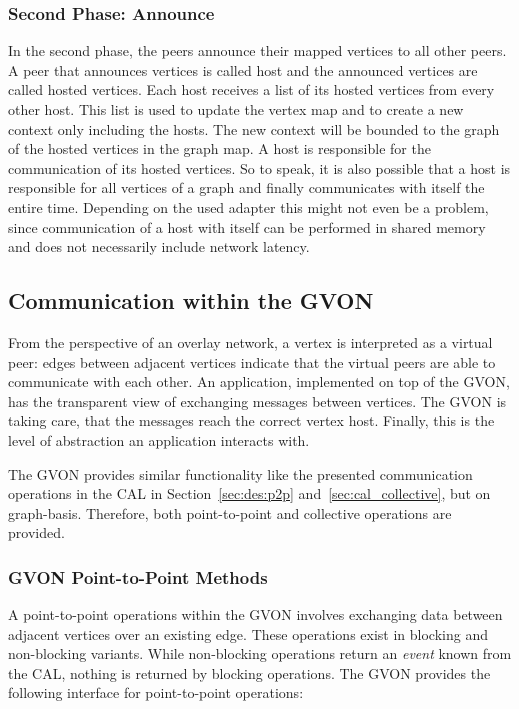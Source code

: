 \subsubsection*{Second Phase: Announce}
In the second phase, the peers announce their mapped vertices to all
other peers.  A peer that announces vertices is called host and the
announced vertices are called hosted vertices.  Each host receives a
list of its hosted vertices from every other host.  This list is used
to update the vertex map and to create a new context only including
the hosts. The new context will be bounded to the graph of the hosted
vertices in the graph map.  A host is responsible for the
communication of its hosted vertices.  So to speak, it is also
possible that a host is responsible for all vertices of a graph and
finally communicates with itself the entire time.  Depending on the
used adapter this might not even be a problem, since communication of
a host with itself can be performed in shared memory and does not
necessarily include network latency.


\subsection{Communication within the GVON}
From the perspective of an overlay network, a vertex is interpreted as
a virtual peer: edges between adjacent vertices indicate that the
virtual peers are able to communicate with each other. An application,
implemented on top of the GVON, has the transparent view of exchanging
messages between vertices. The GVON is taking care, that the messages
reach the correct vertex host.  Finally, this is the level of
abstraction an application interacts with.

The GVON provides similar functionality like the presented
communication operations in the CAL in Section~\ref{sec:des:p2p}
and~\ref{sec:cal_collective}, but on graph-basis. Therefore, both
point-to-point and collective operations are provided.

\subsubsection*{GVON Point-to-Point Methods}
A point-to-point operations within the GVON involves exchanging data
between adjacent vertices over an existing edge.  These operations
exist in blocking and non-blocking variants. While non-blocking
operations return an \emph{event} known from the CAL, nothing is returned by
blocking operations. The GVON provides the following interface for
point-to-point operations:

